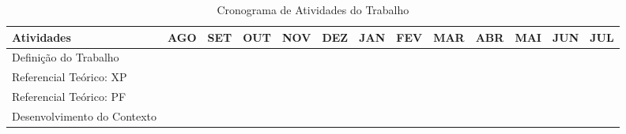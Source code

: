 \begin{table}[]
\centering
\caption{Cronograma de Atividades do Trabalho}
\label{cronograma}
\resizebox{\textwidth}{!} {
\begin{tabular}{|l|l|l|l|l|l|l|l|l|l|l|l|l|}
\hline
\textbf{Atividades}                                                             & \textbf{AGO}             & \textbf{SET}             & \textbf{OUT}                                    & \textbf{NOV}             & \textbf{DEZ}             & \textbf{JAN}             & \textbf{FEV}             & \textbf{MAR}             & \textbf{ABR}             & \textbf{MAI}             & \textbf{JUN}             & \textbf{JUL}             \\ \hline
Definição do Trabalho                                                           & \cellcolor[HTML]{009901} &                          &                                                 &                          &                          &                          &                          &                          &                          &                          &                          &                          \\ \hline
Referencial Teórico: XP                                                         &                          & \cellcolor[HTML]{009901} & \cellcolor[HTML]{009901}                        &                          &                          &                          &                          &                          &                          &                          &                          &                          \\ \hline
Referencial Teórico: PF                                                         &                          &                          & \cellcolor[HTML]{009901}                        & {\color[HTML]{009901} }  &                          &                          &                          &                          &                          &                          &                          &                          \\ \hline
Desenvolvimento do Contexto                                                     &                          &                          & \cellcolor[HTML]{009901}                        & \cellcolor[HTML]{009901} &                          &                          &                          &                          &                          &                          &                          &                          \\ \hline

\end{tabular}}
\end{table}
